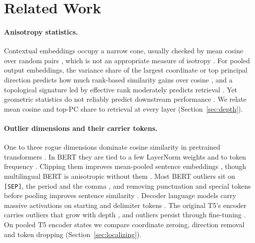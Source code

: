 \section{Related Work}
\label{sec:related}

\paragraph{Anisotropy statistics.}
Contextual embeddings occupy a narrow cone, usually checked by mean cosine over random pairs \citep{gao2019degeneration, ethayarajh2019contextual}, which is not an appropriate measure of isotropy \citep{rudman2022isoscore}.
For pooled output embeddings, the variance share of the largest coordinate or top principal direction predicts how much rank-based similarity gains over cosine \citep{parupudi2026anisotropy}, and a topological signature led by effective rank moderately predicts retrieval \citep{rottach2025topology}.
Yet geometric statistics do not reliably predict downstream performance \citep{nastase2025geometry, kulkarni2026geometry}.
We relate mean cosine and top-PC share to retrieval at every layer (Section~\ref{sec:depth}).

\paragraph{Outlier dimensions and their carrier tokens.}
One to three rogue dimensions dominate cosine similarity in pretrained transformers \citep{timkey2021rogue}.
In BERT they are tied to a few LayerNorm weights and to token frequency \citep{kovaleva2021bertbusters, puccetti2022outlier}.
Clipping them improves mean-pooled sentence embeddings \citep{luo2021positional}, though multilingual BERT is anisotropic without them \citep{rajaee2022mbert}.
Most BERT outliers sit on \texttt{[SEP]}, the period and the comma \citep{bondarenko2023quantizable}, and removing punctuation and special tokens before pooling improves sentence similarity \citep{fusterbaggetto2022anisotropy}.
Decoder language models carry massive activations on starting and delimiter tokens \citep{sun2024massive}.
The original T5's encoder carries outliers that grow with depth \citep{zhao2025outlier}, and outliers persist through fine-tuning \citep{rudman2023outlier}.
On pooled T5 encoder states we compare coordinate zeroing, direction removal and token dropping (Section~\ref{sec:localizing}).

